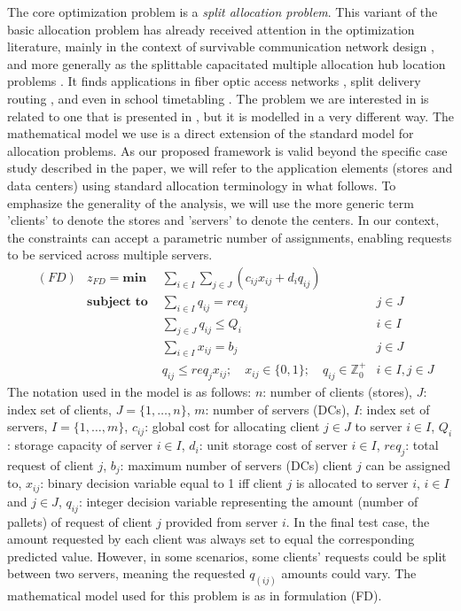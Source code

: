 \documentclass[ijoc,sglanonrev]{informs4}
\begin{document}
The core optimization problem is a {\em split allocation problem}. This variant of the basic allocation problem has already received attention in the optimization literature, mainly in the context of survivable communication network design \citep{MKE75}, and more generally as the splittable capacitated multiple allocation hub location problems \citep{M05}. It finds applications in fiber optic access networks \citep{KLH11}, split delivery routing \citep{DT89}, and even in school timetabling \citet{BBL07}. The problem we are interested in is related to one that is presented in \citet{ZHHY21}, but it is modelled in a very different way.
The mathematical model we use is a direct extension of the standard model for allocation problems. As our proposed framework is valid beyond the specific case study described in the paper, we will refer to the application elements (stores and data centers) using standard allocation terminology in what follows. To emphasize the generality of the analysis, we will use the more generic term 'clients' to denote the stores and 'servers' to denote the centers. In our context, the constraints can accept a parametric number of assignments, enabling requests to be serviced across multiple servers. 
\begin{align}
	&(FD) & z_{FD} = \textbf{min } & \sum_{i \in I} \sum_{j \in J} ( c_{ij}x_{ij} + d_i q_{ij} ) \label{ALLobj}\\
	& &  \textbf{subject to }
	& \sum_{i \in I} q_{ij} = req_j & j \in J  \label{ALLrequest}\\
	& &  & \sum_{j \in J}q_{ij} \leq Q_i & i \in I \label{ALLcapacity}\\
	& &  & \sum_{i \in I} x_{ij} = b_j & j \in J  \label{ALLnumserv}\\
	& &  & q_{ij} \leq req_j x_{ij}; \quad x_{ij} \in \{0,1\};\quad q_{ij} \in \mathbb{Z}^+_0 & i \in I, j \in J \label{ALLcontin}
\end{align}
The notation used in the model is as follows:
	$n$: number of clients (stores),
	$J$: index set of clients, $J=\{1, \ldots, n\}$,
	$m$: number of servers (DCs),
	$I$: index set of servers, $I=\{1, \ldots, m\}$,
	$c_{ij}$: global cost for allocating client $j \in J$ to server $i \in I$,
	$Q_i$: storage capacity of server $i \in I$,
	$d_i$: unit storage cost of server $i \in I$,
	$req_j$: total request of client $j$,
	$b_j$: maximum number of servers (DCs) client $j$ can be assigned to,
	$x_{ij}$: binary decision variable equal to 1 iff client $j$ is allocated to server $i$, $i \in I$ and $j \in J$,
	$q_{ij}$: integer decision variable representing the amount (number of pallets) of request of client $j$ provided from server $i$.
In the final test case, the amount requested by each client was always set to equal the corresponding predicted value. However, in some scenarios, some clients' requests could be split between two servers, meaning the requested $q_(ij)$ amounts could vary.
The mathematical model used for this problem is as in formulation (FD).
\end{document}
